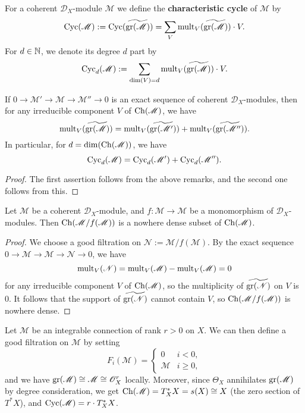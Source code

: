 \begin{definition}
For a coherent $\mathscr{D}_X$-module $\mathscr{M}$ we define the \textbf{characteristic cycle} of $\mathscr{M}$ by
\[\mathrm{Cyc}(\mathscr{M}):=\mathrm{Cyc}(\widetilde{\mathrm{gr}(\mathscr{M})})=\sum_V\mathrm{mult}_V(\widetilde{\mathrm{gr}(\mathscr{M})})\cdot V.\]
For $d\in\mathbb{N}$, we denote its degree $d$ part by
\[\mathrm{Cyc}_d(\mathscr{M}):=\sum_{\dim(V)=d}\mathrm{mult}_V(\widetilde{\mathrm{gr}(\mathscr{M})})\cdot V.\]
\end{definition}

\begin{proposition}\label{D-module coh associated cycle additive}
If $0\to\mathscr{M}'\to\mathscr{M}\to\mathscr{M}''\to 0$ is an exact sequence of coherent $\mathscr{D}_X$-modules, then for any irreducible component $V$ of $\mathrm{Ch}(\mathscr{M})$, we have
\[\mathrm{mult}_V(\widetilde{\mathrm{gr}(\mathscr{M})})=\mathrm{mult}_V(\widetilde{\mathrm{gr}(\mathscr{M}')})+\mathrm{mult}_V(\widetilde{\mathrm{gr}(\mathscr{M}'')}).\]
In particular, for $d=\dim(\mathrm{Ch}(\mathscr{M}))$, we have
\[\mathrm{Cyc}_d(\mathscr{M})=\mathrm{Cyc}_d(\mathscr{M}')+\mathrm{Cyc}_d(\mathscr{M}'').\]
\end{proposition}
\begin{proof}
The first assertion follows from the above remarks, and the second one follows from this.
\end{proof}

\begin{proposition}\label{D-module coh associated cycle of coker of monomorphism prop}
Let $\mathscr{M}$ be a coherent $\mathscr{D}_X$-module, and $f:\mathscr{M}\to\mathscr{M}$ be a monomorphism of $\mathscr{D}_X$-modules. Then $\mathrm{Ch}(\mathscr{M}/f(\mathscr{M}))$ is a nowhere dense subset of $\mathrm{Ch}(\mathscr{M})$.
\end{proposition}
\begin{proof}
We choose a good filtration on $\mathscr{N}:=\mathscr{M}/f(\mathscr{M})$. By the exact sequence $0\to\mathscr{M}\to\mathscr{M}\to\mathscr{N}\to 0$, we have
\[\mathrm{mult}_V(\mathscr{N})=\mathrm{mult}_V(\mathscr{M})-\mathrm{mult}_V(\mathscr{M})=0\]
for any irreducible component $V$ of $\mathrm{Ch}(\mathscr{M})$, so the multiplicity of $\widetilde{\mathrm{gr}(\mathscr{N})}$ on $V$ is $0$. It follows that the support of $\widetilde{\mathrm{gr}(\mathscr{N})}$ cannot contain $V$, so $\mathrm{Ch}(\mathscr{M}/f(\mathscr{M}))$ is nowhere dense.
\end{proof}

\begin{example}
Let $\mathscr{M}$ be an integrable connection of rank $r>0$ on $X$. We can then define a good filtration on $\mathscr{M}$ by setting
\[F_i(\mathscr{M})=\begin{cases}
0&i<0,\\
\mathscr{M}&i\geq 0,
\end{cases}\]
and we have $\mathrm{gr}(\mathscr{M})\cong\mathscr{M}\cong\mathscr{O}_X^r$ locally. Moreover, since $\Theta_X$ annihilates $\mathrm{gr}(\mathscr{M})$ by degree consideration, we get $\mathrm{Ch}(\mathscr{M})=T^*_XX=s(X)\cong X$ (the zero section of $T^*X$), and $\mathrm{Cyc}(\mathscr{M})=r\cdot T^*_XX$.
\end{example}

